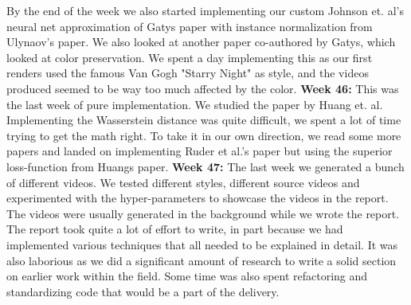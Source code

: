\documentclass{article}
\begin{document}
By the end of the week we also started implementing our custom Johnson et. al's neural net approximation of Gatys paper with instance normalization from Ulynaov's paper. We also looked at another paper co-authored by Gatys, which looked at color preservation. We spent a day implementing this as our first renders used the famous Van Gogh "Starry Night" as style, and the videos produced seemed to be way too much affected by the color.
\newline\newline
\textbf{Week 46:} \newline
This was the last week of pure implementation. We studied the paper by Huang et. al. Implementing the Wasserstein distance was quite difficult, we spent a lot of time trying to get the math right. To take it in our own direction, we read some more papers and landed on implementing Ruder et al.'s paper \cite{Ruder:1} but using the superior loss-function from Huangs paper.
\newline\newline
\textbf{Week 47:} \newline
The last week we generated a bunch of different videos. We tested different styles, different source videos and experimented with the hyper-parameters to showcase the videos in the report. The videos were usually generated in the background while we wrote the report. The report took quite a lot of effort to write, in part because we had implemented various techniques that all needed to be explained in detail. It was also laborious as we did a significant amount of research to write a solid section on earlier work within the field. Some time was also spent refactoring and standardizing code that would be a part of the delivery.
\end{document}
